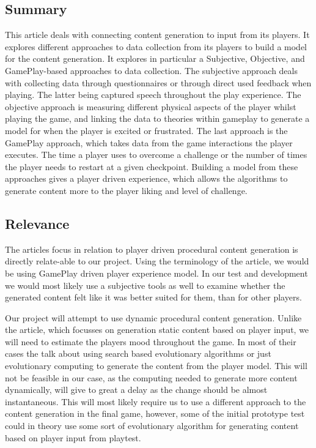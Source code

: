 \documentclass[a4paper,11pt]{article}
\begin{document}
\subsection{Summary}
This article deals with connecting content generation to input from its players. It explores different approaches to data collection from its players to build a model for the content generation.
It explores in particular a Subjective, Objective, and GamePlay-based approaches to data collection. 
The subjective approach deals with collecting data through questionnaires or through direct used feedback when playing. The latter being captured speech throughout the play experience.
The objective approach is measuring different physical aspects of the player whilst playing the game, and linking the data to theories within gameplay to generate a model for when the player is excited or frustrated.
The last approach is the GamePlay approach, which takes data from the game interactions the player executes. The time a player uses to overcome a challenge or the number of times the player needs to restart at a given checkpoint.
Building a model from these approaches gives a player driven experience, which allows the algorithms to generate content more to the player liking and level of challenge. 
\subsection{Relevance}
The articles focus in relation to player driven procedural content generation is directly relate-able to our project. Using the terminology of the article, we would be using GamePlay driven player experience model. In our test and development we would most likely use a subjective tools as well to examine whether the generated content felt like it was better suited for them, than for other players. 

Our project will attempt to use dynamic procedural content generation. Unlike the article, which focusses on generation static content based on player input, we will need to estimate the players mood throughout the game. In most of their cases the talk about using search based evolutionary algorithms or just evolutionary computing to generate the content from the player model. This will not be feasible in our case, as the computing needed to generate more content dynamically, will give to great a delay as the change should be almost instantaneous. 
This will most likely require us to use a different approach to the content generation in the final game, however, some of the initial prototype test could in theory use some sort of evolutionary algorithm for generating content based on player input from playtest. 
\pagebreak
\end{document}
